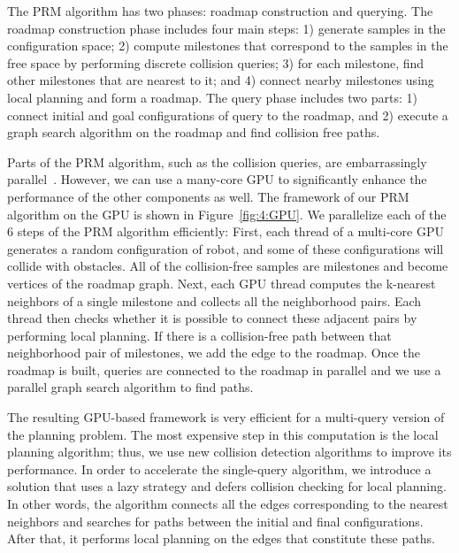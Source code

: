 The PRM algorithm has two phases: roadmap construction and querying. The roadmap construction phase includes four main steps: 1) generate samples in the configuration space; 2) compute milestones that correspond to the samples in the free space by performing discrete collision queries; 3) for each milestone, find other milestones that are nearest to it; and 4) connect nearby milestones using local planning and form a roadmap. The query phase includes two parts: 1) connect initial and goal configurations of query to the roadmap, and 2) execute a graph search algorithm on the roadmap and find collision free paths.

Parts of the PRM algorithm, such as the collision queries, are embarrassingly parallel~\cite{Amato99}. However, we can use a many-core GPU to significantly enhance the performance of the other components as well. The framework of our PRM algorithm on the GPU is shown in Figure~\ref{fig:4:GPU}. We parallelize each of the $6$ steps of the PRM algorithm efficiently: First, each thread of a multi-core GPU generates a random configuration of robot, and some of these configurations will collide with obstacles. All of the collision-free samples are milestones and become vertices of the roadmap graph. Next, each GPU thread computes the k-nearest neighbors of a single milestone and collects all the neighborhood pairs. Each thread then checks whether it is possible to connect these adjacent pairs by performing local planning. If there is a collision-free path between that neighborhood pair of milestones, we add the edge to the roadmap. Once the roadmap is built, queries are connected to the roadmap in parallel and we use a parallel graph search algorithm to find paths.

The resulting GPU-based framework is very efficient for a multi-query version of the planning problem. The most expensive step in this computation is the local planning algorithm; thus, we use new collision detection algorithms to improve its performance. In order to accelerate the single-query algorithm, we introduce a solution that uses a lazy strategy and defers collision checking for local planning. In other words, the algorithm connects all the edges corresponding to the nearest neighbors and searches for paths between the initial and final configurations. After that, it performs local planning on the edges that constitute these paths.

